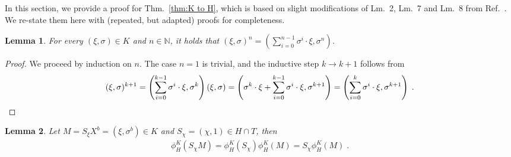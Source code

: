 \documentclass[aps,pra,letterpaper,onrcolumn,nofootinbib,notitlepage,longbibliography]{revtex4-1}
\newtheorem{lemma}{Lemma}
\newcommand{\ra}{\ensuremath{\rightarrow}}
\begin{document}
In this section, we provide a proof for Thm.~\ref{thm:K to H}, which is based on slight modifications of Lm.~2, Lm.~7 and Lm.~8 from Ref.~\cite{FrembsChungOkay2022}. We re-state them here with (repeated, but adapted) proofs for completeness.

\begin{lemma}{\label{lem: xi,sigma to power n}}
    For every $(\xi,\sigma)\in K$ and $n\in\mathbb{N}$, it holds that $(\xi,\sigma)^n=\left(\sum_{i=0}^{n-1}\sigma^i\cdot\xi,\sigma^n\right)$.
\end{lemma}

\begin{proof}
    We proceed by induction on $n$. The case $n=1$ is trivial, and the inductive step $k\ra k+1$ follows from
    \begin{align*}
        \hspace{3cm}
        (\xi,\sigma)^{k+1}
        =\left(\sum_{i=0}^{k-1}\sigma^i\cdot\xi,\sigma^k\right)(\xi,\sigma)
        =\left(\sigma^k\cdot\xi+\sum_{i=0}^{k-1}\sigma^i\cdot\xi,\sigma^{k+1}\right)
        =\left(\sum_{i=0}^k\sigma^i\cdot\xi,\sigma^{k+1}\right)\; .\hspace{3cm}\qedhere
    \end{align*}
\end{proof}

\vspace{.2cm}

\begin{lemma}{\label{lem: pull chi out in K}}
    Let $M=S_\xi X^b=(\xi,\sigma^b)\in K$ and $S_\chi=(\chi,1)\in H\cap T$, then
    \begin{align*}
        \phi^K_H(S_{\chi}M)=\phi^K_H(S_{\chi})\phi^K_H(M)=S_\chi \phi^K_H(M)\; .
    \end{align*}
\end{lemma}
\end{document}

